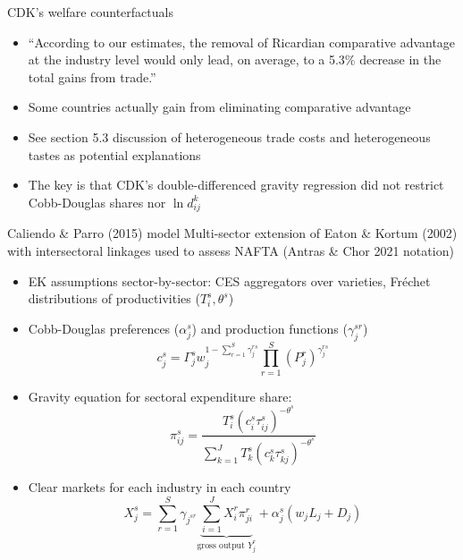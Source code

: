 \documentclass[10pt,notes=hide]{beamer}
\begin{document}
\begin{frame}{CDK's welfare counterfactuals}
\begin{itemize}
	\item ``According to our estimates, the removal of Ricardian comparative advantage at the industry level would only lead, on average, to a 5.3\% decrease in the total gains from trade.''
	\item Some countries actually gain from eliminating comparative advantage
	\item See section 5.3 discussion of heterogeneous trade costs and heterogeneous tastes as potential explanations
	\item The key is that CDK's double-differenced gravity regression did not restrict Cobb-Douglas shares nor $\ln d_{ij}^k$
\end{itemize}
\end{frame}
\begin{frame}{Caliendo \& Parro (2015) model}
Multi-sector extension of Eaton \& Kortum (2002) with intersectoral linkages used to assess NAFTA
(Antras \& Chor 2021 notation)
\begin{itemize}	
\item EK assumptions sector-by-sector: CES aggregators over varieties, Fréchet distributions of productivities ($T^{s}_{i},\theta^{s}$)
\item Cobb-Douglas preferences ($\alpha_{j}^s$) and production functions ($\gamma_{j}^{sr}$)
$$
c_{j}^{s}
=
\Gamma_{j}^{s} w_j^{1-\sum_{r=1}^{S} \gamma_{j}^{rs}} \prod_{r=1}^{S} \left(P_{j}^{r}\right)^{\gamma_{j}^{rs}}
$$
\item Gravity equation for sectoral expenditure share:
$$
\pi_{ij}^{s}
=
\frac{T_{i}^{s}\left(c_{i}^{s}\tau_{ij}^{s}\right)^{-\theta^{s}}}
{\sum_{k=1}^{J} T_{k}^{s}\left(c_{k}^{s}\tau_{kj}^{s}\right)^{-\theta^{s}}}
$$
\item Clear markets for each industry in each country
$$
X_{j}^{s} = \sum_{r=1}^{S} \gamma_{j^{sr}}
\underbrace{\sum_{i=1}^{J} X_i^r \pi_{ji}^{r}}_{\text{gross output } Y_{j}^{r}}
+ 
\alpha_{j}^{s}\left(w_j L_j + D_j\right)
$$
\end{itemize}
\end{frame}
\end{document}
